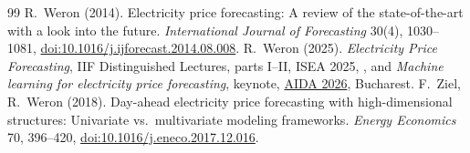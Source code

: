 \begin{thebibliography}{99}
 R.~Weron (2014). Electricity price forecasting: A review of the state-of-the-art with a look into the future. \emph{International Journal of Forecasting} 30(4), 1030--1081, \href{https://doi.org/10.1016/j.ijforecast.2014.08.008}{doi:10.1016/j.ijforecast.2014.08.008}.
 R.~Weron (2025). \emph{Electricity Price Forecasting}, IIF Distinguished Lectures, parts I--II, ISEA 2025, \href{https://p.wz.pwr.edu.pl/~weron.rafal/Conf/IIF24}{}, and \emph{Machine learning for electricity price forecasting}, keynote, \href{https://www.ai4efin.ase.ro/aida-conference/}{AIDA 2026}, Bucharest.
 F.~Ziel, R.~Weron (2018). Day-ahead electricity price forecasting with high-dimensional structures: Univariate vs.\ multivariate modeling frameworks. \emph{Energy Economics} 70, 396--420, \href{https://doi.org/10.1016/j.eneco.2017.12.016}{doi:10.1016/j.eneco.2017.12.016}.
\end{thebibliography}

